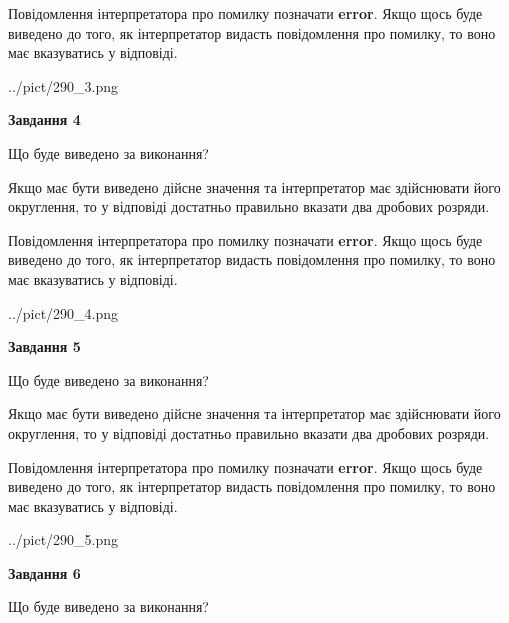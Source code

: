 \documentclass[12pt, ukrainian]{article}
\begin{document}
{\begin {Large}
Повідомлення інтерпретатора про помилку позначати \textbf{error}.
Якщо щось буде виведено до того, як інтерпретатор видасть повідомлення про помилку, 
то воно має вказуватись у відповіді. \par

\begin{center}
	{../pict/290_3.png}
\end{center}
\newpage

{\begin {center}\textbf{Завдання 4}\end {center}}\par
Що буде виведено за виконання? \par

Якщо має бути виведено дійсне значення та інтерпретатор має здійснювати його округлення, 
то у відповіді достатньо правильно вказати два дробових розряди.

Повідомлення інтерпретатора про помилку позначати \textbf{error}.
Якщо щось буде виведено до того, як інтерпретатор видасть повідомлення про помилку, 
то воно має вказуватись у відповіді. \par

\begin{center}
	{../pict/290_4.png}
\end{center}
\newpage

{\begin {center}\textbf{Завдання 5}\end {center}}\par
Що буде виведено за виконання? \par

Якщо має бути виведено дійсне значення та інтерпретатор має здійснювати його округлення, 
то у відповіді достатньо правильно вказати два дробових розряди.

Повідомлення інтерпретатора про помилку позначати \textbf{error}.
Якщо щось буде виведено до того, як інтерпретатор видасть повідомлення про помилку, 
то воно має вказуватись у відповіді. \par

\begin{center}
	{../pict/290_5.png}
\end{center}
\newpage

{\begin {center}\textbf{Завдання 6}\end {center}}\par
Що буде виведено за виконання? \par


\end{Large}}
\end{document}
